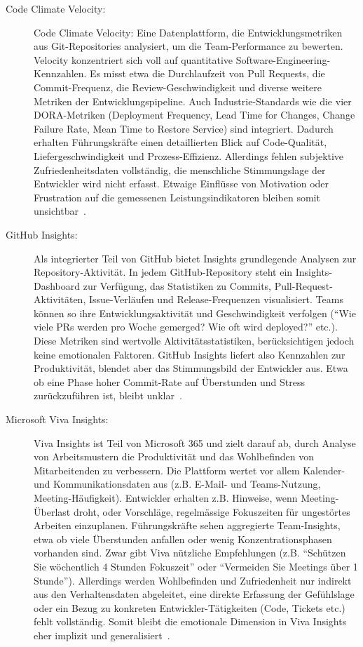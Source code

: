 \documentclass[12pt,a4paper]{report}
\begin{document}
\begin{description}
  \item[Code Climate Velocity:] Code Climate Velocity: Eine Datenplattform, die Entwicklungsmetriken aus Git-Repositories analysiert,
    um die Team-Performance zu bewerten. Velocity konzentriert sich voll auf quantitative Software-Engineering-Kennzahlen. Es misst
    etwa die Durchlaufzeit von Pull Requests, die Commit-Frequenz, die Review-Geschwindigkeit und diverse weitere Metriken der
    Entwicklungspipeline. Auch Industrie-Standards wie die vier DORA-Metriken (Deployment Frequency, Lead Time for Changes, Change
    Failure Rate, Mean Time to Restore Service) sind integriert. Dadurch erhalten Führungskräfte einen detaillierten Blick auf
    Code-Qualität, Liefergeschwindigkeit und Prozess-Effizienz. Allerdings fehlen subjektive Zufriedenheitsdaten vollständig, die
    menschliche Stimmungslage der Entwickler wird nicht erfasst. Etwaige Einflüsse von Motivation oder Frustration auf die
    gemessenen Leistungsindikatoren bleiben somit unsichtbar~\cite{infoworld_codeclimate_2023}.

  \item[GitHub Insights:] Als integrierter Teil von GitHub bietet Insights grundlegende Analysen zur Repository-Aktivität. In jedem
    GitHub-Repository steht ein Insights-Dashboard zur Verfügung, das Statistiken zu Commits, Pull-Request-Aktivitäten,
    Issue-Verläufen und Release-Frequenzen visualisiert. Teams können so ihre Entwicklungsaktivität und Geschwindigkeit verfolgen
    (“Wie viele PRs werden pro Woche gemerged? Wie oft wird deployed?” etc.). Diese Metriken sind wertvolle Aktivitätsstatistiken,
    berücksichtigen jedoch keine emotionalen Faktoren. GitHub Insights liefert also Kennzahlen zur Produktivität, blendet aber das
    Stimmungsbild der Entwickler aus. Etwa ob eine Phase hoher Commit-Rate auf Überstunden und Stress zurückzuführen ist, bleibt
    unklar~\cite{axify_git_2025}.

  \item[Microsoft Viva Insights:] Viva Insights ist Teil von Microsoft 365 und zielt darauf ab, durch Analyse von Arbeitsmustern die
    Produktivität und das Wohlbefinden von Mitarbeitenden zu verbessern. Die Plattform wertet vor allem Kalender- und
    Kommunikationsdaten aus (z.B. E-Mail- und Teams-Nutzung, Meeting-Häufigkeit). Entwickler erhalten z.B. Hinweise, wenn
    Meeting-Überlast droht, oder Vorschläge, regelmässige Fokuszeiten für ungestörtes Arbeiten einzuplanen. Führungskräfte sehen
    aggregierte Team-Insights, etwa ob viele Überstunden anfallen oder wenig Konzentrationsphasen vorhanden sind. Zwar gibt Viva
    nützliche Empfehlungen (z.B. “Schützen Sie wöchentlich 4 Stunden Fokuszeit” oder “Vermeiden Sie Meetings über 1 Stunde”).
    Allerdings werden Wohlbefinden und Zufriedenheit nur indirekt aus den Verhaltensdaten abgeleitet, eine direkte Erfassung der
    Gefühlslage oder ein Bezug zu konkreten Entwickler-Tätigkeiten (Code, Tickets etc.) fehlt vollständig. Somit bleibt die
    emotionale Dimension in Viva Insights eher implizit und generalisiert~\cite{zachminers_introduction_nodate}.
\end{description}
\end{document}
